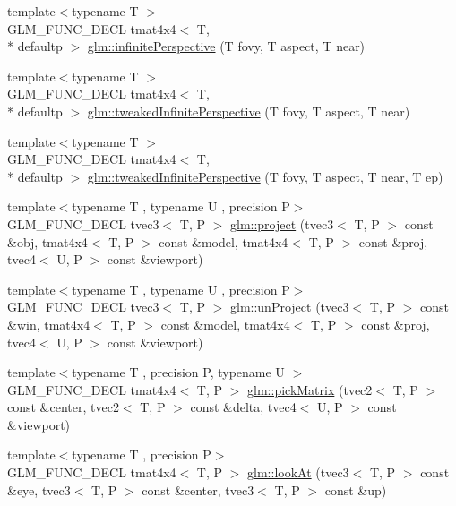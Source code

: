 \begin{DoxyCompactItemize}
\item 
{\footnotesize template$<$typename T $>$ }\\G\-L\-M\-\_\-\-F\-U\-N\-C\-\_\-\-D\-E\-C\-L tmat4x4$<$ T, \\*
defaultp $>$ \hyperlink{group__gtc__matrix__transform_ga79f704ad91a5f0d68abd88c66c8186e5}{glm\-::infinite\-Perspective} (T fovy, T aspect, T near)
\item 
{\footnotesize template$<$typename T $>$ }\\G\-L\-M\-\_\-\-F\-U\-N\-C\-\_\-\-D\-E\-C\-L tmat4x4$<$ T, \\*
defaultp $>$ \hyperlink{group__gtc__matrix__transform_gaed64bd81f5ecdab52fecbdf7f6b58194}{glm\-::tweaked\-Infinite\-Perspective} (T fovy, T aspect, T near)
\item 
{\footnotesize template$<$typename T $>$ }\\G\-L\-M\-\_\-\-F\-U\-N\-C\-\_\-\-D\-E\-C\-L tmat4x4$<$ T, \\*
defaultp $>$ \hyperlink{group__gtc__matrix__transform_gaa50fce7f50b5d5da881ed30f5532a921}{glm\-::tweaked\-Infinite\-Perspective} (T fovy, T aspect, T near, T ep)
\item 
{\footnotesize template$<$typename T , typename U , precision P$>$ }\\G\-L\-M\-\_\-\-F\-U\-N\-C\-\_\-\-D\-E\-C\-L tvec3$<$ T, P $>$ \hyperlink{group__gtc__matrix__transform_gad743556abd138264d4f06f4ca27f1d7e}{glm\-::project} (tvec3$<$ T, P $>$ const \&obj, tmat4x4$<$ T, P $>$ const \&model, tmat4x4$<$ T, P $>$ const \&proj, tvec4$<$ U, P $>$ const \&viewport)
\item 
{\footnotesize template$<$typename T , typename U , precision P$>$ }\\G\-L\-M\-\_\-\-F\-U\-N\-C\-\_\-\-D\-E\-C\-L tvec3$<$ T, P $>$ \hyperlink{group__gtc__matrix__transform_ga82a558de3ce42cbeed0f6ec292a4e1b3}{glm\-::un\-Project} (tvec3$<$ T, P $>$ const \&win, tmat4x4$<$ T, P $>$ const \&model, tmat4x4$<$ T, P $>$ const \&proj, tvec4$<$ U, P $>$ const \&viewport)
\item 
{\footnotesize template$<$typename T , precision P, typename U $>$ }\\G\-L\-M\-\_\-\-F\-U\-N\-C\-\_\-\-D\-E\-C\-L tmat4x4$<$ T, P $>$ \hyperlink{group__gtc__matrix__transform_ga9026c77505b99990f68826f27c267dc5}{glm\-::pick\-Matrix} (tvec2$<$ T, P $>$ const \&center, tvec2$<$ T, P $>$ const \&delta, tvec4$<$ U, P $>$ const \&viewport)
\item 
{\footnotesize template$<$typename T , precision P$>$ }\\G\-L\-M\-\_\-\-F\-U\-N\-C\-\_\-\-D\-E\-C\-L tmat4x4$<$ T, P $>$ \hyperlink{group__gtc__matrix__transform_gaf8eef81da1ad09f6a8920101c01eaae4}{glm\-::look\-At} (tvec3$<$ T, P $>$ const \&eye, tvec3$<$ T, P $>$ const \&center, tvec3$<$ T, P $>$ const \&up)

\end{DoxyCompactItemize}
